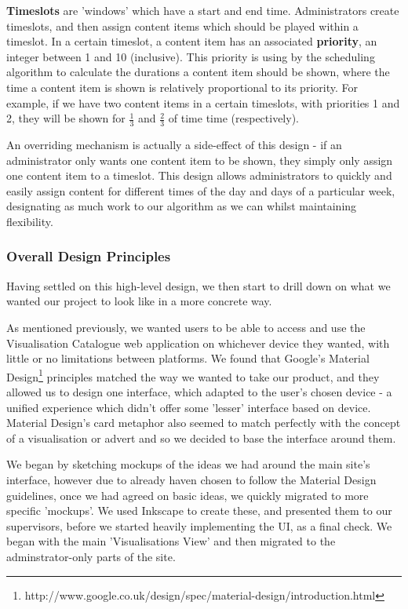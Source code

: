 \documentclass[a4paper, titlepage]{article}
\begin{document}
\textbf{Timeslots} are 'windows' which have a start and end time. Administrators create timeslots, and then assign content items which should be played within a timeslot. In a certain timeslot, a content item has an associated \textbf{priority}, an integer between 1 and 10 (inclusive). This priority is using by the scheduling algorithm to calculate the durations a content item should be shown, where the time a content item is shown is relatively proportional to its priority. For example, if we have two content items in a certain timeslots, with priorities 1 and 2, they will be shown for $\frac{1}{3}$ and $\frac{2}{3}$ of time time (respectively).

An overriding mechanism is actually a side-effect of this design - if an administrator only wants one content item to be shown, they simply only assign one content item to a timeslot. This design allows administrators to quickly and easily assign content for different times of the day and days of a particular week, designating as much work to our algorithm as we can whilst maintaining flexibility.

\subsubsection{Overall Design Principles}
Having settled on this high-level design, we then start to drill down on what we wanted our project to look like in a more concrete way.

As mentioned previously, we wanted users to be able to access and use the Visualisation Catalogue web application on whichever device they wanted, with little or no limitations between platforms. We found that Google's Material Design\footnote{http://www.google.co.uk/design/spec/material-design/introduction.html} principles matched the way we wanted to take our product, and they allowed us to design one interface, which adapted to the user's chosen device - a unified experience which didn't offer some 'lesser' interface based on device. Material Design's card metaphor also seemed to match perfectly with the concept of a visualisation or advert and so we decided to base the interface around them.

We began by sketching mockups of the ideas we had around the main site's interface, however due to already haven chosen to follow the Material Design guidelines, once we had agreed on basic ideas, we quickly migrated to more specific 'mockups'. We used Inkscape to create these, and presented them to our supervisors, before we started heavily implementing the UI, as a final check. We began with the main 'Visualisations View' and then migrated to the adminstrator-only parts of the site.
\end{document}
